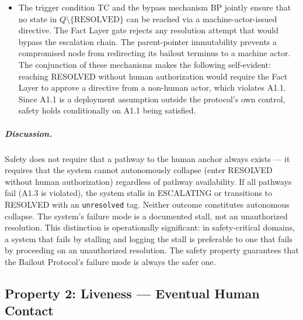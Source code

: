 \begin{itemize}
\item[\textbf{Step 3.}] The trigger condition TC and the bypass mechanism BP jointly ensure that no state in $Q \setminus \{\text{RESOLVED}\}$ can be reached via a machine-actor-issued directive. The Fact Layer gate rejects any resolution attempt that would bypass the escalation chain. The parent-pointer immutability prevents a compromised node from redirecting its bailout terminus to a machine actor. The conjunction of these mechanisms makes the following self-evident: reaching RESOLVED without human authorization would require the Fact Layer to approve a directive from a non-human actor, which violates A1.1. Since A1.1 is a deployment assumption outside the protocol's own control, safety holds conditionally on A1.1 being satisfied.
\end{itemize}

\subparagraph{Discussion.} Safety does not require that a pathway to the human anchor always exists --- it requires that the system cannot autonomously collapse (enter RESOLVED without human authorization) regardless of pathway availability. If all pathways fail (A1.3 is violated), the system stalls in ESCALATING or transitions to RESOLVED with an \texttt{unresolved} tag. Neither outcome constitutes autonomous collapse. The system's failure mode is a documented stall, not an unauthorized resolution. This distinction is operationally significant: in safety-critical domains, a system that fails by stalling and logging the stall is preferable to one that fails by proceeding on an unauthorized resolution. The safety property guarantees that the Bailout Protocol's failure mode is always the safer one.

\subsection{Property 2: Liveness --- Eventual Human Contact}



